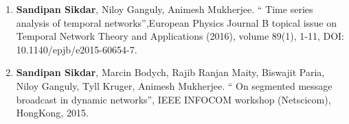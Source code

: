 \begin{enumerate}
   \item  {\bf Sandipan Sikdar}, Niloy Ganguly, Animesh Mukherjee. `` Time series analysis of temporal networks'',European Physics Journal B topical issue on  Temporal Network Theory and Applications (2016), volume 89(1), 1-11, DOI: 10.1140/epjb/e2015-60654-7.
   \item  {\bf Sandipan Sikdar}, Marcin Bodych, Rajib Ranjan Maity, Biswajit Paria, Niloy Ganguly, Tyll Kruger, Animesh Mukherjee. `` On segmented message broadcast 
   in dynamic networks'', IEEE INFOCOM workshop (Netscicom), HongKong, 2015.
\end{enumerate}

